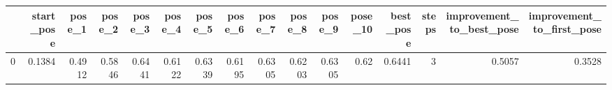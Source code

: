 \begin{tabular}{lrrrrrrrrrrrrrrr}
\toprule
{} &  start\_pose &  pose\_1 &  pose\_2 &  pose\_3 &  pose\_4 &  pose\_5 &  pose\_6 &  pose\_7 &  pose\_8 &  pose\_9 &  pose\_10 &  best\_pose &  steps &  improvement\_to\_best\_pose &  improvement\_to\_first\_pose \\
\midrule
0 &      0.1384 &  0.4912 &  0.5846 &  0.6441 &  0.6122 &  0.6339 &  0.6195 &  0.6305 &  0.6203 &  0.6305 &     0.62 &     0.6441 &      3 &                    0.5057 &                     0.3528 \\
\bottomrule
\end{tabular}
